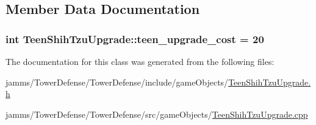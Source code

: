 \subsection{Member Data Documentation}
\hypertarget{class_teen_shih_tzu_upgrade_a1906281df65ebb43797e1fb804967a2c}{
\subsubsection[{teen\+\_\+upgrade\+\_\+cost}]{\setlength{\rightskip}{0pt plus 5cm}int Teen\+Shih\+Tzu\+Upgrade\+::teen\+\_\+upgrade\+\_\+cost = 20\hspace{0.3cm}{\ttfamily [static]}}}\label{class_teen_shih_tzu_upgrade_a1906281df65ebb43797e1fb804967a2c}


The documentation for this class was generated from the following files\+:\begin{DoxyCompactItemize}
\item 
jamms/\+Tower\+Defense/\+Tower\+Defense/include/game\+Objects/\hyperlink{_teen_shih_tzu_upgrade_8h}{Teen\+Shih\+Tzu\+Upgrade.\+h}\item 
jamms/\+Tower\+Defense/\+Tower\+Defense/src/game\+Objects/\hyperlink{_teen_shih_tzu_upgrade_8cpp}{Teen\+Shih\+Tzu\+Upgrade.\+cpp}\end{DoxyCompactItemize}
